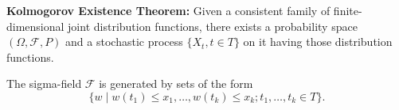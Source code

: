 \textbf{Kolmogorov Existence Theorem:} Given a consistent family of finite-dimensional joint distribution functions, there exists a probability space $(\Omega, \mathcal{F}, P)$ and a stochastic process $\{X_t, t \in T\}$ on it having those distribution functions.

The sigma-field $\mathcal{F}$ is generated by sets of the form
$$\{w \mid w(t_1) \leq x_1, \ldots, w(t_k) \leq x_k; t_1, \ldots, t_k \in T\}.$$
